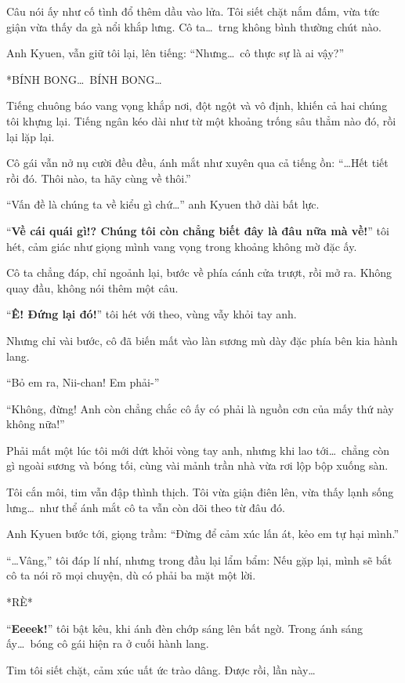 \documentclass[../main.tex]{subfiles}
\begin{document}
Câu nói ấy như cố tình đổ thêm dầu vào lửa. Tôi siết chặt nắm đấm, vừa tức giận vừa thấy da gà nổi khắp lưng. Cô ta\dots\ trng không bình thường chút nào.

Anh Kyuen, vẫn giữ tôi lại, lên tiếng: ``Nhưng\dots\ cô thực sự là ai vậy?''

*BÍNH BONG\dots\ BÍNH BONG\dots*

Tiếng chuông báo vang vọng khắp nơi, đột ngột và vô định, khiến cả hai chúng tôi khựng lại. Tiếng ngân kéo dài như từ một khoảng trống sâu thẳm nào đó, rồi lại lặp lại.

Cô gái vẫn nở nụ cười đều đều, ánh mắt như xuyên qua cả tiếng ồn: ``\dots Hết tiết rồi đó. Thôi nào, ta hãy cùng về thôi.''

``Vấn đề là chúng ta về kiểu gì chứ\dots'' anh Kyuen thở dài bất lực.

``\textbf{Về cái quái gì!? Chúng tôi còn chẳng biết đây là đâu nữa mà về!}'' tôi hét, cảm giác như giọng mình vang vọng trong khoảng không mờ đặc ấy.

Cô ta chẳng đáp, chỉ ngoảnh lại, bước về phía cánh cửa trượt, rồi mở ra. Không quay đầu, không nói thêm một câu.

``\textbf{Ê! Đứng lại đó!}'' tôi hét với theo, vùng vẫy khỏi tay anh.

Nhưng chỉ vài bước, cô đã biến mất vào làn sương mù dày đặc phía bên kia hành lang.

``Bỏ em ra, Nii-chan! Em phải-''

``Không, đừng! Anh còn chẳng chắc cô ấy có phải là nguồn cơn của mấy thứ này không nữa!''

Phải mất một lúc tôi mới dứt khỏi vòng tay anh, nhưng khi lao tới\dots\ chẳng còn gì ngoài sương và bóng tối, cùng vài mảnh trần nhà vừa rơi lộp bộp xuống sàn.

Tôi cắn môi, tim vẫn đập thình thịch. Tôi vừa giận điên lên, vừa thấy lạnh sống lưng\dots\ như thể ánh mắt cô ta vẫn còn dõi theo từ đâu đó.

Anh Kyuen bước tới, giọng trầm: ``Đừng để cảm xúc lấn át, kẻo em tự hại mình.''

``\dots Vâng,'' tôi đáp lí nhí, nhưng trong đầu lại lẩm bẩm: Nếu gặp lại, mình sẽ bắt cô ta nói rõ mọi chuyện, dù có phải ba mặt một lời.

*RÈ*

``\textbf{Eeeek!}'' tôi bật kêu, khi ánh đèn chớp sáng lên bất ngờ. Trong ánh sáng ấy\dots\ bóng cô gái hiện ra ở cuối hành lang.

Tim tôi siết chặt, cảm xúc uất ức trào dâng. Được rồi, lần này\dots
\end{document}

